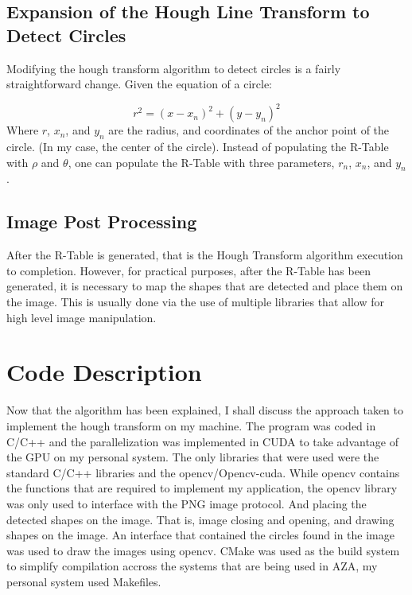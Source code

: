 \documentclass[conference]{IEEEtran}
\begin{document}
\subsection{Expansion of the Hough Line Transform to Detect Circles}
Modifying the hough transform algorithm to detect circles is a fairly straightforward change. 
Given the equation of a circle: 

\begin{equation}
  r^2 = {(x - x_n)}^2 + {(y - y_n)}^2
  \label{eq:circle-parameterization}
\end{equation}
Where $r$, $x_n$, and $y_n$ are the radius, and coordinates of the anchor point of the circle. (In my case, the center of the circle). 
Instead of populating the R-Table with $\rho$ and $\theta$, one can populate the R-Table with three parameters, $r_{n}$, $x_{n}$, and $y_{n}$. 


\subsection{Image Post Processing}
After the R-Table is generated, that is the Hough Transform algorithm execution to completion. 
However, for practical purposes, after the R-Table has been generated, it is necessary to map the shapes that are detected and place them on the image. 
This is usually done via the use of multiple libraries that allow for high level image manipulation. 


\section{Code Description}
Now that the algorithm has been explained, I shall discuss the approach taken to implement the hough transform on my machine. 
The program was coded in C/C++ and the parallelization was implemented in CUDA to take advantage of the GPU on my personal system. 
The only libraries that were used were the standard C/C++ libraries and the opencv/Opencv-cuda. 
While opencv contains the functions that are required to implement my application, the opencv library was only used to interface with the PNG image protocol. And placing the detected shapes on the image.
That is, image closing and opening, and drawing shapes on the image.
An interface that contained the circles found in the image was used to draw the images using opencv. 
CMake was used as the build system to simplify compilation accross the systems that are being used in AZA, my personal system used Makefiles. 
\end{document}
